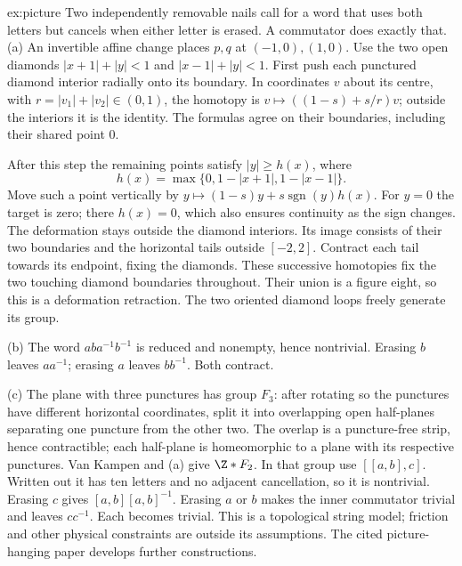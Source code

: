 \begin{solution}{ex:picture}
\idea Two independently removable nails call for a word that uses both letters but cancels when either letter is erased. A commutator does exactly that.
\writeup (a) An invertible affine change places $p,q$ at $(-1,0),(1,0)$. Use the two open diamonds $|x+1|+|y|<1$ and $|x-1|+|y|<1$. First push each punctured diamond interior radially onto its boundary. In coordinates $v$ about its centre, with $r=|v_1|+|v_2|\in(0,1)$, the homotopy is $v\mapsto((1-s)+s/r)v$; outside the interiors it is the identity. The formulas agree on their boundaries, including their shared point $0$.

After this step the remaining points satisfy $|y|\ge h(x)$, where
\[
h(x)=\max\{0,1-|x+1|,1-|x-1|\}.
\]
Move such a point vertically by $y\mapsto(1-s)y+s\operatorname{sgn}(y)h(x)$. For $y=0$ the target is zero; there $h(x)=0$, which also ensures continuity as the sign changes. The deformation stays outside the diamond interiors. Its image consists of their two boundaries and the horizontal tails outside $[-2,2]$. Contract each tail towards its endpoint, fixing the diamonds. These successive homotopies fix the two touching diamond boundaries throughout. Their union is a figure eight, so this is a deformation retraction. The two oriented diamond loops freely generate its group.

(b) The word $aba^{-1}b^{-1}$ is reduced and nonempty, hence nontrivial. Erasing $b$ leaves $aa^{-1}$; erasing $a$ leaves $bb^{-1}$. Both contract.

(c) The plane with three punctures has group $F_3$: after rotating so the punctures have different horizontal coordinates, split it into overlapping open half-planes separating one puncture from the other two. The overlap is a puncture-free strip, hence contractible; each half-plane is homeomorphic to a plane with its respective punctures. Van Kampen and (a) give $\Z\ast F_2$. In that group use $[[a,b],c]$. Written out it has ten letters and no adjacent cancellation, so it is nontrivial. Erasing $c$ gives $[a,b][a,b]^{-1}$. Erasing $a$ or $b$ makes the inner commutator trivial and leaves $cc^{-1}$. Each becomes trivial. This is a topological string model; friction and other physical constraints are outside its assumptions. The cited picture-hanging paper develops further constructions.
\end{solution}

